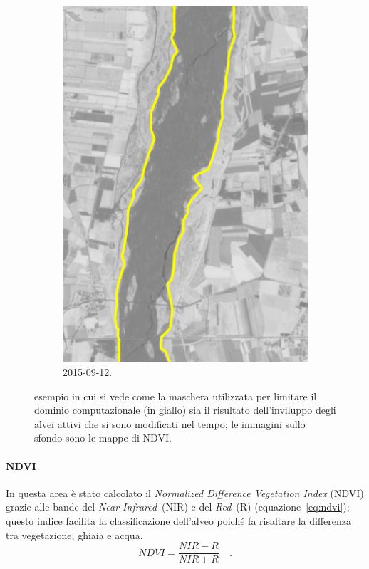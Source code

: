 \begin{figure}
	\qquad
	\begin{subfigure}[b]{0.4\textwidth}
		\includegraphics[width=\textwidth]{files/esempio_mask_2015_09_12.jpeg}
		\caption{\Se{} 2015-09-12.}
	\end{subfigure}
	\caption[definizione della maschera per limitare il dominio computazionale]
		{esempio in cui si vede come la maschera utilizzata per limitare il dominio computazionale (in giallo) sia il risultato dell'inviluppo degli alvei attivi che si sono modificati nel tempo; le immagini sullo sfondo sono le mappe di NDVI.}
	\label{fig:esempio-maschera}
\end{figure}
%
%
\paragraph{NDVI} 
In questa area è stato calcolato il \emph{\foreignlanguage{english}{Normalized Difference Vegetation Index}} (NDVI) grazie alle bande del \emph{Near Infrared}~(NIR) e del \emph{Red}~(R) (equazione~\eqref{eq:ndvi}); questo indice facilita la classificazione dell'alveo poiché fa risaltare la differenza tra vegetazione, ghiaia e acqua.
%
\begin{equation}
	NDVI = \frac{NIR - R}{NIR + R}	\quad	.
	\label{eq:ndvi}
\end{equation}
%
%

